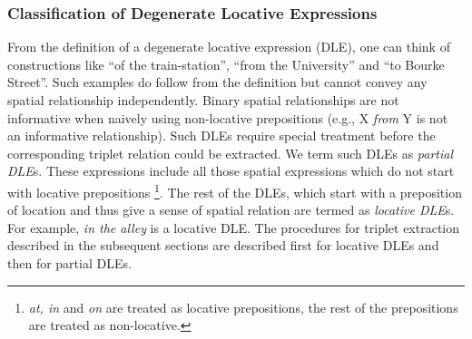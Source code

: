 \documentclass{sig-alternate}
\begin{document}
\subsubsection*{Classification of Degenerate Locative Expressions}
From the definition of a degenerate locative expression (DLE), one can think of constructions like ``of the train-station'', ``from the University'' and ``to Bourke Street''. Such examples do follow from the definition but cannot convey any spatial relationship independently. Binary spatial relationships are not informative when naively using non-locative prepositions (e.g., X \textit{from} Y is not an informative relationship). Such DLEs require special treatment before the corresponding triplet relation could be extracted. We term such DLEs as \textit{partial DLE}s. These expressions include all those spatial expressions which do not start with locative prepositions
\footnote{
\textit{at, in} and \textit{on} are treated as locative prepositions, the rest of the prepositions are treated as non-locative.
}.
The rest of the DLEs, which start with a preposition of location and thus give a sense of spatial relation are termed as \textit{locative DLE}s. For example, \textit{in the alley} is a locative DLE. The procedures for triplet extraction described in the subsequent sections are described first for locative DLEs and then for partial DLEs.
\end{document}
